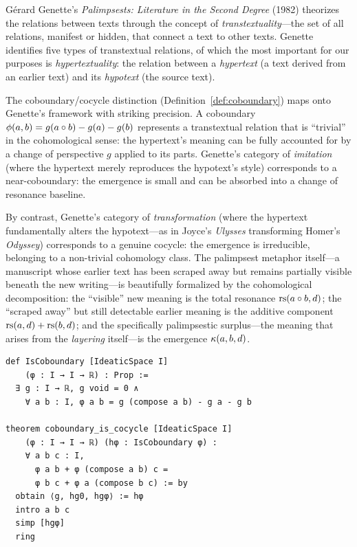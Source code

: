 \begin{interpretation}\label{interp:ch2:genette_palimpsests}
G\'erard Genette's \emph{Palimpsests: Literature in the Second Degree}
(1982) theorizes the relations between texts through the concept of
\emph{transtextuality}---the set of all relations, manifest or hidden,
that connect a text to other texts. Genette identifies five types of
transtextual relations, of which the most important for our purposes is
\emph{hypertextuality}: the relation between a \emph{hypertext} (a text
derived from an earlier text) and its \emph{hypotext} (the source text).

The coboundary/cocycle distinction (Definition~\ref{def:coboundary})
maps onto Genette's framework with striking precision. A coboundary
$\phi(a, b) = g(a \circ b) - g(a) - g(b)$ represents a transtextual
relation that is ``trivial'' in the cohomological sense: the hypertext's
meaning can be fully accounted for by a change of perspective $g$ applied
to its parts. Genette's category of \emph{imitation} (where the hypertext
merely reproduces the hypotext's style) corresponds to a near-coboundary:
the emergence is small and can be absorbed into a change of resonance
baseline.

By contrast, Genette's category of \emph{transformation} (where the
hypertext fundamentally alters the hypotext---as in Joyce's
\emph{Ulysses} transforming Homer's \emph{Odyssey}) corresponds to a
genuine cocycle: the emergence is irreducible, belonging to a non-trivial
cohomology class. The palimpsest metaphor itself---a manuscript whose
earlier text has been scraped away but remains partially visible
beneath the new writing---is beautifully formalized by the cohomological
decomposition: the ``visible'' new meaning is the total resonance
$\mathrm{rs}(a \circ b, d)$; the ``scraped away'' but still detectable earlier
meaning is the additive component $\mathrm{rs}(a, d) + \mathrm{rs}(b, d)$; and the
specifically palimpsestic surplus---the meaning that arises from the
\emph{layering} itself---is the emergence $\kappa(a, b, d)$.
\end{interpretation}

\begin{lstlisting}[language=Lean4, caption={Coboundary predicate and
verification in Lean 4}]
def IsCoboundary [IdeaticSpace I] 
    (φ : I → I → ℝ) : Prop :=
  ∃ g : I → ℝ, g void = 0 ∧
    ∀ a b : I, φ a b = g (compose a b) - g a - g b

theorem coboundary_is_cocycle [IdeaticSpace I]
    (φ : I → I → ℝ) (hφ : IsCoboundary φ) :
    ∀ a b c : I,
      φ a b + φ (compose a b) c =
      φ b c + φ a (compose b c) := by
  obtain ⟨g, hg0, hgφ⟩ := hφ
  intro a b c
  simp [hgφ]
  ring
\end{lstlisting}

